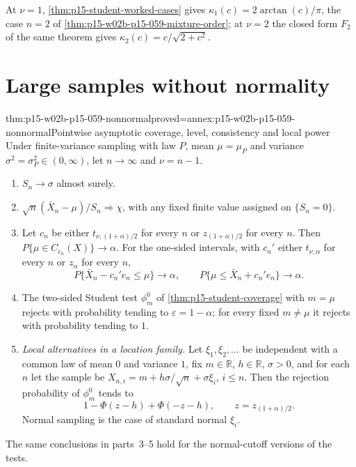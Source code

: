 At \(\nu=1\), \cref{thm:p15-student-worked-cases} gives
\(\kappa_1(c)=2\arctan(c)/\pi\), the case \(n=2\) of
\cref{thm:p15-w02b-p15-059-mixture-order}; at \(\nu=2\) the closed form
\(F_2\) of the same theorem gives \(\kappa_2(c)=c/\sqrt{2+c^2}\).

\section{Large samples without normality}
\label{sec:p15-w02b-p15-059-nonnormal}

\begin{hbtheorem}{thm:p15-w02b-p15-059-nonnormal}{proved=annex:p15-w02b-p15-059-nonnormal}{Pointwise asymptotic coverage, level, consistency and local power}
Under finite-variance sampling with law \(P\), mean \(\mu=\mu_P\) and
variance \(\sigma^2=\sigma_P^2\in(0,\infty)\), let \(n\to\infty\) and
\(\nu=n-1\).
\begin{enumerate}
\item \(S_n\to\sigma\) almost surely.
\item \(\sqrt n(\bar X_n-\mu)/S_n\Rightarrow\chi\), with any fixed finite
value assigned on \(\{S_n=0\}\).
\item Let \(c_n\) be either \(t_{\nu,(1+\alpha)/2}\) for every \(n\) or
\(z_{(1+\alpha)/2}\) for every \(n\). Then
\(P\{\mu\in C_{c_n}(X)\}\to\alpha\). For the one-sided intervals,
with \(c_n'\) either \(t_{\nu,\alpha}\) for every \(n\) or \(z_\alpha\) for every \(n\),
\[
 P\{\bar X_n-c_n'e_n\leq\mu\}\to\alpha,\qquad
 P\{\mu\leq\bar X_n+c_n'e_n\}\to\alpha .
\]
\item The two-sided Student test \(\phi_m^0\) of
\cref{thm:p15-student-coverage} with \(m=\mu\) rejects with probability
tending to \(\varepsilon=1-\alpha\); for every fixed \(m\neq\mu\) it
rejects with probability tending to \(1\).
\item \emph{Local alternatives in a location family.} Let
\(\xi_1,\xi_2,\ldots\) be independent with a common law of mean \(0\) and
variance \(1\), fix \(m\in\mathbb R\), \(h\in\mathbb R\), \(\sigma>0\),
and for each \(n\) let the sample be
\(X_{n,i}=m+h\sigma/\sqrt n+\sigma\xi_i\), \(i\leq n\). Then the
rejection probability of \(\phi_m^0\) tends to
\[
 1-\Phi(z-h)+\Phi(-z-h),\qquad z=z_{(1+\alpha)/2}.
\]
Normal sampling is the case of standard normal \(\xi_i\).
\end{enumerate}
The same conclusions in parts~3--5 hold for the normal-cutoff versions of
the tests.
\end{hbtheorem}

